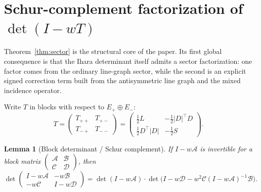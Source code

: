 \documentclass[11pt]{article}
\newtheorem{lemma}{Lemma}
\begin{document}
\section{Schur-complement factorization of $\det(I-wT)$}

Theorem~\ref{thm:sector} is the structural core of the paper. Its first global consequence is that the Ihara determinant itself admits a sector factorization: one factor comes from the ordinary line-graph sector, while the second is an explicit signed correction term built from the antisymmetric line graph and the mixed incidence operator.

Write $T$ in blocks with respect to $E_+\oplus E_-$:
\[
T=\begin{pmatrix}T_{++} & T_{+-}\\ T_{-+} & T_{--}\end{pmatrix}
=
\begin{pmatrix}
\frac12 L & -\frac12|D|^\top D\\[2pt]
\frac12 D^\top|D| & -\frac12 S
\end{pmatrix}.
\]

\begin{lemma}[Block determinant / Schur complement]\label{lem:schur}
If $I-w\mathcal A$ is invertible for a block matrix
$\begin{pmatrix}\mathcal A & \mathcal B\\ \mathcal C & \mathcal D\end{pmatrix}$, then
\[
\det\!\begin{pmatrix}I-w\mathcal A & -w\mathcal B\\ -w\mathcal C & I-w\mathcal D\end{pmatrix}
=\det(I-w\mathcal A)\cdot \det\!\bigl(I-w\mathcal D-w^2\mathcal C(I-w\mathcal A)^{-1}\mathcal B\bigr).
\]
\end{lemma}
\end{document}
